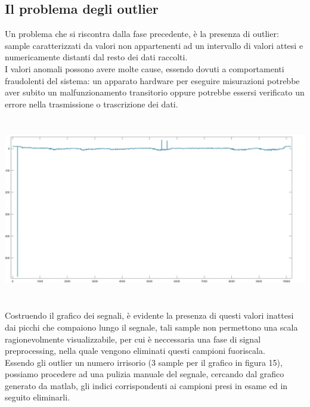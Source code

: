 \documentclass[a4paper]{article}
\begin{document}
\subsection{Il problema degli outlier}
Un problema che si riscontra dalla fase precedente, è la presenza di outlier: sample caratterizzati da valori non appartenenti ad un intervallo di valori attesi e numericamente distanti dal resto dei dati raccolti.  \\
I valori anomali possono avere molte cause, essendo dovuti a comportamenti fraudolenti del sistema: un apparato hardware per eseguire misurazioni potrebbe aver subito un malfunzionamento transitorio oppure potrebbe essersi verificato un errore nella trasmissione o trascrizione dei dati. \\
\begin{minipage}{\linewidth}
\begin{center}
\vspace{7mm}
\includegraphics[width=154mm, height= 80mm]{./images/registrazione_tesi/outliers.jpg} 
\vspace{7mm}
\end{center}
\end{minipage}
\makebox[\linewidth]{}
Costruendo il grafico dei segnali, è evidente la presenza di questi valori inattesi dai picchi che compaiono lungo il segnale, tali sample non permettono una scala ragionevolmente visualizzabile, per cui è neccessaria una fase di signal preprocessing, nella quale vengono eliminati questi campioni fuoriscala. \\
Essendo gli outlier un numero irrisorio (3 sample per il grafico in figura 15), possiamo procedere ad una pulizia manuale del segnale, cercando dal grafico generato da matlab, gli indici corrispondenti ai campioni presi in esame ed in seguito eliminarli.
\end{document}
